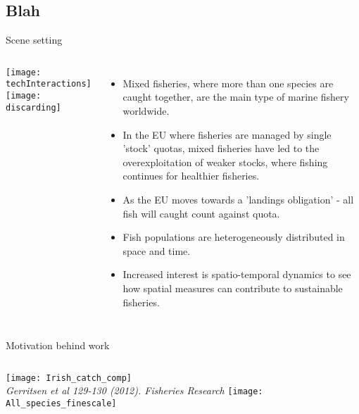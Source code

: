 \documentclass[xcolor=x11names,compress]{beamer}
\renewcommand{\(}{\begin{columns}}
\renewcommand{\)}{\end{columns}}
\newcommand{\<}[1]{\begin{column}{#1}}
\renewcommand{\>}{\end{column}}
\begin{document}
\subsection{Blah}
\begin{frame}{Scene setting}

\begin{columns}
	
	
\column{0.3\paperwidth}
\vspace{-2cm}
\texttt{[image: techInteractions]}\\ 
\texttt{[image: discarding]} 

\column{0.7\paperwidth}

\begin{itemize}
	\small	
	\setlength\itemsep{1em}
	\pause
	\item Mixed fisheries, where more than one species are caught together,
		are the main type of marine fishery worldwide. \pause
	\item In the EU where fisheries are managed by single 'stock' quotas,
		mixed fisheries have led to the overexploitation of weaker
		stocks, where fishing continues for healthier fisheries. \pause
	\item As the EU moves towards a 'landings obligation' - all fish will
		caught count against quota. \pause
	\item Fish populations are heterogeneously distributed in space and
		time.  \pause
	\item Increased interest is spatio-temporal dynamics to see how spatial
		measures can contribute to sustainable fisheries. 
\end{itemize}
	
\end{columns}

\end{frame}

\begin{frame}{Motivation behind work}

\begin{columns}
\column{0.4\paperwidth}
\texttt{[image: Irish\_catch\_comp]}
\\
\tiny
\hspace{0.2cm}
\textit{Gerritsen et al 129-130 (2012). Fisheries Research} 
\column{0.6\paperwidth}
\texttt{[image: All\_species\_finescale]}

\end{columns}
\end{frame}
\end{document}
